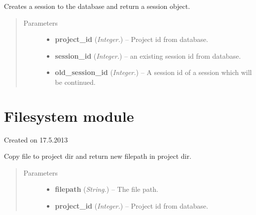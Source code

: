 \documentclass[letterpaper,10pt,english]{sphinxmanual}
\begin{document}

\begin{fulllineitems}
\label{api:controller.StartNewSession}
Creates a session to the database and return a session object.
\begin{quote}\begin{description}
\item[{Parameters}] \leavevmode\begin{itemize}
\item {} 
\textbf{project\_id} (\emph{Integer.}) -- Project id from database.

\item {} 
\textbf{session\_id} (\emph{Integer.}) -- an existing session id from database.

\item {} 
\textbf{old\_session\_id} (\emph{Integer.}) -- A session id of a session which will be continued.

\end{itemize}

\end{description}\end{quote}

\end{fulllineitems}



\section{Filesystem module}
\label{api:module-filesystem}\label{api:filesystem-module}
Created on 17.5.2013

\begin{fulllineitems}
\label{api:filesystem.CopyFileToProject}
Copy file to project dir and return new filepath in project dir.
\begin{quote}\begin{description}
\item[{Parameters}] \leavevmode\begin{itemize}
\item {} 
\textbf{filepath} (\emph{String.}) -- The file path.

\item {} 
\textbf{project\_id} (\emph{Integer.}) -- Project id from database.

\end{itemize}

\end{description}\end{quote}

\end{fulllineitems}
\end{document}
